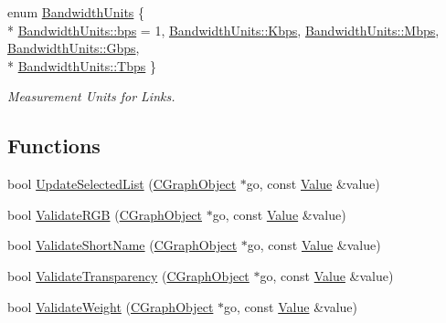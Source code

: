 \begin{DoxyCompactItemize}
\item 
enum \hyperlink{namespace_n_m_1_1_o_d_b_a82ec977b166b6e4d8c1078f4b40cfeeb}{Bandwidth\+Units} \{ \\*
\hyperlink{namespace_n_m_1_1_o_d_b_a82ec977b166b6e4d8c1078f4b40cfeebaecf6fbc4690b6ecd2245d8db1602bda7}{Bandwidth\+Units\+::bps} = 1, 
\hyperlink{namespace_n_m_1_1_o_d_b_a82ec977b166b6e4d8c1078f4b40cfeebab99d40c4c3087ba4b0f089a27c43edcf}{Bandwidth\+Units\+::\+Kbps}, 
\hyperlink{namespace_n_m_1_1_o_d_b_a82ec977b166b6e4d8c1078f4b40cfeebaa2f7c2a743a6cdf5ede1d4320346b574}{Bandwidth\+Units\+::\+Mbps}, 
\hyperlink{namespace_n_m_1_1_o_d_b_a82ec977b166b6e4d8c1078f4b40cfeebae6e66a64a195b5f506856d32a4e8031b}{Bandwidth\+Units\+::\+Gbps}, 
\\*
\hyperlink{namespace_n_m_1_1_o_d_b_a82ec977b166b6e4d8c1078f4b40cfeeba50dbfff253c0cd0840f2c65b98182365}{Bandwidth\+Units\+::\+Tbps}
 \}\begin{DoxyCompactList}\small\item\em Measurement Units for Links. \end{DoxyCompactList}
\end{DoxyCompactItemize}
\subsection*{Functions}
\begin{DoxyCompactItemize}
\item 
bool \hyperlink{namespace_n_m_1_1_o_d_b_aeeabc6d3c429398d50dc3068a9d368d5}{Update\+Selected\+List} (\hyperlink{class_n_m_1_1_o_d_b_1_1_c_graph_object}{C\+Graph\+Object} $\ast$go, const \hyperlink{class_n_m_1_1_o_d_b_1_1_value}{Value} \&value)
\item 
bool \hyperlink{namespace_n_m_1_1_o_d_b_a6fa1a5823ebe38bcc63d0bc3f763490a}{Validate\+R\+G\+B} (\hyperlink{class_n_m_1_1_o_d_b_1_1_c_graph_object}{C\+Graph\+Object} $\ast$go, const \hyperlink{class_n_m_1_1_o_d_b_1_1_value}{Value} \&value)
\item 
bool \hyperlink{namespace_n_m_1_1_o_d_b_a06512e780429615a8a630c597c7e01e6}{Validate\+Short\+Name} (\hyperlink{class_n_m_1_1_o_d_b_1_1_c_graph_object}{C\+Graph\+Object} $\ast$go, const \hyperlink{class_n_m_1_1_o_d_b_1_1_value}{Value} \&value)
\item 
bool \hyperlink{namespace_n_m_1_1_o_d_b_a43b4ca78a4f89bba7d83fed9a2ee46db}{Validate\+Transparency} (\hyperlink{class_n_m_1_1_o_d_b_1_1_c_graph_object}{C\+Graph\+Object} $\ast$go, const \hyperlink{class_n_m_1_1_o_d_b_1_1_value}{Value} \&value)
\item 
bool \hyperlink{namespace_n_m_1_1_o_d_b_aa96361eb049c92303ea787388b358c0c}{Validate\+Weight} (\hyperlink{class_n_m_1_1_o_d_b_1_1_c_graph_object}{C\+Graph\+Object} $\ast$go, const \hyperlink{class_n_m_1_1_o_d_b_1_1_value}{Value} \&value)
\end{DoxyCompactItemize}


